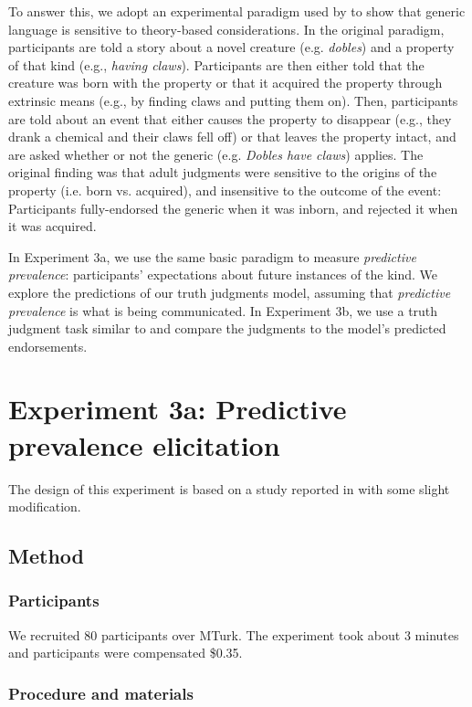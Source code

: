 \documentclass[12pt,letterpaper]{article}
\begin{document}
To answer this, we adopt an experimental paradigm used by  to show that generic language is sensitive to theory-based considerations.
In the original paradigm, participants are told a story about a novel creature (e.g. \emph{dobles}) and a property of that kind (e.g., \emph{having claws}).
Participants are then either told that the creature was born with the property or that it acquired the property through extrinsic means (e.g., by finding claws and putting them on). 
Then, participants are told about an event that either causes the property to disappear (e.g., they drank a chemical and their claws fell off) or that leaves the property intact, and are asked whether or not the generic (e.g. \emph{Dobles have claws}) applies.
The original finding was that adult judgments were sensitive to the origins of the property (i.e. born vs. acquired), and insensitive to the outcome of the event: Participants fully-endorsed the generic when it was inborn, and rejected it when it was acquired.

In Experiment 3a, we use the same basic paradigm to measure \emph{predictive prevalence}: participants' expectations about future instances of the kind.
We explore the predictions of our truth judgments model, assuming that \emph{predictive prevalence} is what is being communicated.
In Experiment 3b, we use a truth judgment task similar to  and compare the judgments to the model's predicted endorsements.

\section*{Experiment 3a: Predictive prevalence elicitation}

The design of this experiment is based on a study reported in  with some slight modification.

\subsection*{Method}

\subsubsection*{Participants}
We recruited 80 participants over MTurk.  
The experiment took about 3 minutes and participants were compensated \$0.35.

\subsubsection*{Procedure and materials}
\end{document}
